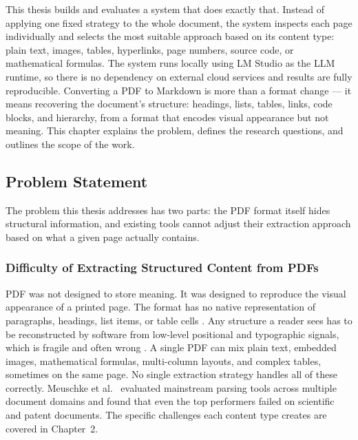 \documentclass[12pt]{article}
\begin{document}
This thesis builds and evaluates a system that does exactly that. Instead of
applying one fixed strategy to the whole document, the system inspects each page
individually and selects the most suitable approach based on its content type:
plain text, images, tables, hyperlinks, page numbers, source code, or
mathematical formulas. The system runs locally using LM Studio as the LLM
runtime, so there is no dependency on external cloud services and results are
fully reproducible. Converting a PDF to Markdown is more than a format change ---
it means recovering the document's structure: headings, lists, tables, links,
code blocks, and hierarchy, from a format that encodes visual appearance but not
meaning. This chapter explains the problem, defines the research questions, and
outlines the scope of the work.

\subsection{Problem Statement}

The problem this thesis addresses has two parts: the PDF format itself hides
structural information, and existing tools cannot adjust their extraction
approach based on what a given page actually contains.

\subsubsection{Difficulty of Extracting Structured Content from PDFs}

PDF was not designed to store meaning. It was designed to reproduce the
visual appearance of a printed page. The format has no native representation
of paragraphs, headings, list items, or table cells \cite{whitington2012}.
Any structure a reader sees has to be reconstructed by software from
low-level positional and typographic signals, which is fragile and often
wrong \cite{zhu2022}. A single PDF can mix plain text, embedded images,
mathematical formulas, multi-column layouts, and complex tables, sometimes
on the same page. No single extraction strategy handles all of these
correctly. Meuschke et al.\ \cite{meuschke2023} evaluated mainstream parsing
tools across multiple document domains and found that even the top performers
failed on scientific and patent documents.
The specific challenges each content type creates are covered in Chapter~2.
\end{document}

